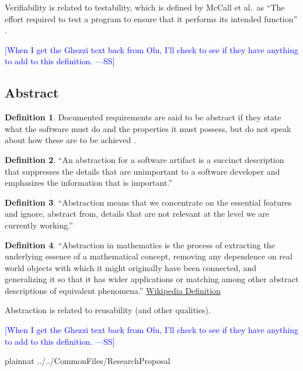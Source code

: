 \documentclass[letterpaper,cleveref]{lipics-v2019}
\newcommand{\authornote}[3]{\textcolor{#1}{[#3 ---#2]}}
\newcommand{\authornote}[3]{}
\newcommand{\wss}[1]{\authornote{blue}{SS}{#1}} %
\theoremstyle{definition}
\newtheorem{defn}{Definition}
\begin{document}
Verifiability is related to testability, which is defined by McCall et al.\ as
``The effort required to test a program to ensure that it performs its intended
function'' \cite{VanVliet2000}.  

\wss{When I get the Ghezzi text back from Olu,
  I'll check to see if they have anything to add to this definition.}

\subsection{Abstract}

\begin{defn}
Documented requirements are said to be abstract if they state what the software
must do and the properties it must possess, but do not speak about how these are
to be achieved \citep{GhezziEtAl2003}.  
\end{defn}

\begin{defn}
``An abstraction for a software artifact is a succinct description that suppresses
the details that are unimportant to a software developer and emphasizes the
information that is important.'' \cite{Krueger1992}
\end{defn}

\begin{defn}
``Abstraction means that we concentrate on the essential features and ignore,
abstract from, details that are not relevant at the level we are currently
working.''  \cite[p.\ 296]{VanVliet2000}
\end{defn}

\begin{defn}
``Abstraction in mathematics is the process of extracting the underlying essence
of a mathematical concept, removing any dependence on real world objects with
which it might originally have been connected, and generalizing it so that it
has wider applications or matching among other abstract descriptions of
equivalent phenomena.''
\href{https://en.wikipedia.org/wiki/Abstraction_(mathematics)} {Wikipedia
  Definition}
\end{defn}

Abstraction is related to reusability (and other qualities).

\wss{When I get the Ghezzi text back from Olu, I'll check to see if they have
  anything to add to this definition.}

\newpage

 {plainnat}
 {../../CommonFiles/ResearchProposal}
\end{document}
